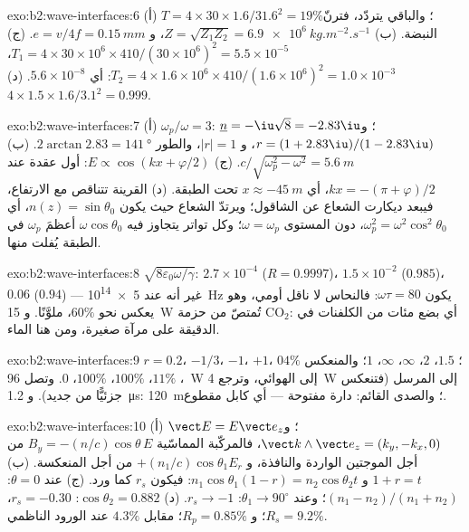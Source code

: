 \begin{solution}{exo:b2:wave-interfaces:6}
(أ) $T = 4 \times 30 \times 1.6/31.6^2 = 19\%$؛ والباقي يتردّد، فترنّ النبضة.
(ب) $Z = \sqrt{Z_1Z_2} = \qty{6.9e6}{kg.m^{-2}.s^{-1}}$، و $e = v/4f = \qty{0.15}{mm}$.
(ج) $T_1 = 4 \times 30 \times 10^6 \times 410/(30 \times 10^6)^2 = 5.5 \times 10^{-5}$، $T_2 = 4 \times 1.6 \times
10^6 \times 410/(1.6 \times 10^6)^2 = 1.0 \times 10^{-3}$: أي $5.6 \times 10^{-8}$. (د) $4 \times 1.5 \times 1.6/
3.1^2 = 0.999$.
\end{solution}

\begin{solution}{exo:b2:wave-interfaces:7}
(أ) $\omega_p/\omega = 3$: $\underline n = -\iu\sqrt8 = -2.83\iu$؛ و $r = (1 + 2.83\iu)/(1 - 2.83
\iu)$، و $|r| = 1$، والطور $2\arctan2.83 = \qty{141}{\degree}$. (ب) $c/\sqrt{\omega_p^2 - \omega^2}
= \qty{5.6}{m}$. (ج) $E \propto \cos(kx + \varphi/2)$: أول عقدة عند $kx = -(\pi + \varphi)/2$،
أي $x \approx \qty{-45}{m}$ تحت الطبقة. (د) القرينة تتناقص مع الارتفاع، فيبعد
ديكارت الشعاع عن الشاقول؛ ويرتدّ الشعاع حيث يكون
$n(z) = \sin\theta_0$، أي $\omega_p^2 = \omega^2\cos^2\theta_0$، دون المستوى $\omega = \omega_p$؛
وكل تواتر يتجاوز فيه $\omega\cos\theta_0$ أعظمَ $\omega_p$ في الطبقة
يُفلت منها.
\end{solution}

\begin{solution}{exo:b2:wave-interfaces:8}
$\sqrt{8\varepsilon_0\omega/\gamma}$: $2.7 \times 10^{-4}$ ($R = 0.9997$)، $1.5 \times 10^{-2}$ ($0.985$)،
$0.06$ ($0.94$) --- غير أنه عند \qty{5e14}{Hz} يكون $\omega\tau = 80$: فالنحاس
 لا ناقل أومي، وهو يعكس نحو $60\%$، ملوَّنًا. و \qty{15}{W}
تُمتصّ من حزمة CO$_2$: أي بضع مئات من الكلفنات في الدقيقة على مرآة
صغيرة، ومن هنا الماء.
\end{solution}

\begin{solution}{exo:b2:wave-interfaces:9}
$r = 0.2$، $-1/3$، $-1$، $+1$، $0$؛  $1.5$، $2$، $\infty$، $\infty$، $1$؛
والمنعكس $4\%$، $11\%$، $100\%$، $100\%$، $0$. وتصل \qty{96}{W} إلى الهوائي، وترجع
\qty{4}{W} إلى المرسل (فتنعكس جزئيًّا من جديد). و \qty{1.2}{\micro s}:
\qty{120}{m}؛ والصدى القائم: دارة مفتوحة --- أي كابل مقطوع.
\end{solution}

\begin{solution}{exo:b2:wave-interfaces:10}
(أ) $\vect E = E\vect e_z$؛ و $\vect k\wedge\vect e_z = (k_y, -k_x, 0)$، فالمركّبة المماسّية
$B_y = -(n/c)\cos\theta\,E$ من أجل الموجتين الواردة والنافذة، و
$+(n_1/c)\cos\theta_1E_r$ من أجل المنعكسة. (ب) $1 + r = t$ و $n_1\cos\theta_1
(1 - r) = n_2\cos\theta_2t$: فيكون $r_s$ كما ورد. (ج) عند $\theta = 0$: $(n_1 - n_2)/(n_1 +
n_2)$؛ وعند $\theta_1 \to 90^\circ$: $r_s \to -1$. (د) $\cos\theta_2 = 0.882$: $r_s = -0.30$، $R_s =
9.2\%$؛ و $R_p = 0.85\%$؛ مقابل $4.3\%$ عند الورود الناظمي.
\end{solution}


